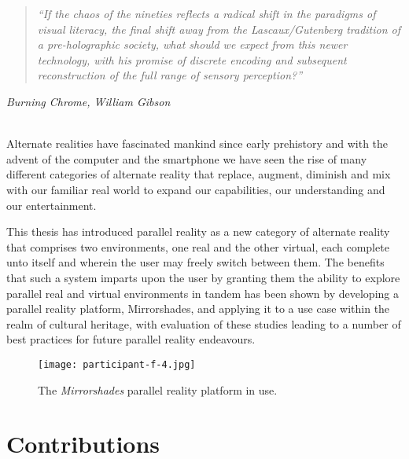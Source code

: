 \begin{quote}
	\textit{``If the chaos of the nineties reflects a radical shift in the paradigms of visual literacy, the final shift away from the Lascaux/Gutenberg tradition of a pre-holographic society, what should we expect from this newer technology, with his promise of discrete encoding and subsequent reconstruction of the full range of sensory perception?''}
\end{quote}
\hfill \textit{Burning Chrome, William Gibson}
\\
\\


\label{chapter-conclusions}

Alternate realities have fascinated mankind since early prehistory and with the advent of the computer and the smartphone we have seen the rise of many different categories of alternate reality that replace, augment, diminish and mix with our familiar real world to expand our capabilities, our understanding and our entertainment.

This thesis has introduced parallel reality as a new category of alternate reality that comprises two environments, one real and the other virtual, each complete unto itself and wherein the user may freely switch between them. The benefits that such a system imparts upon the user by granting them the ability to explore parallel real and virtual environments in tandem has been shown by developing a parallel reality platform, Mirrorshades, and applying it to a use case within the realm of cultural heritage, with evaluation of these studies leading to a number of best practices for future parallel reality endeavours.

\begin{figure}[h]
	\begin{center}
		\texttt{[image: participant-f-4.jpg]}
		\caption{The \textit{Mirrorshades} parallel reality platform in use.}
		\label{participant-f-4.jpg}
	\end{center}	
\end{figure}


\section{Contributions}

